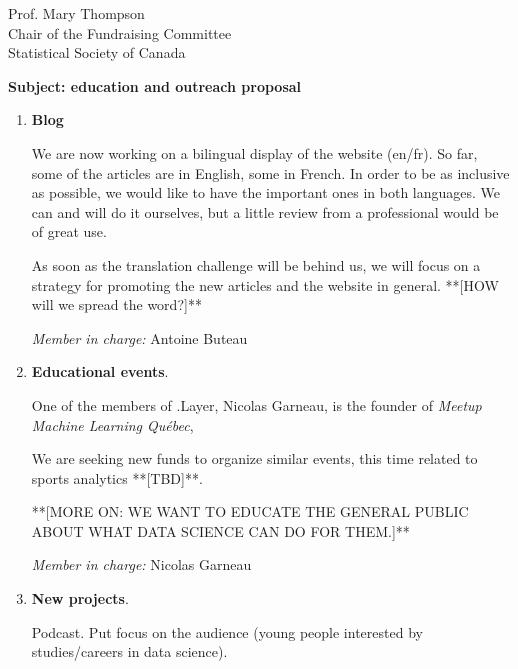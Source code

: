 \documentclass[11pt, a4paper]{letter} %
\begin{document}
\begin{letter}{
	Prof. Mary Thompson\\
	Chair of the Fundraising Committee\\
	Statistical Society of Canada
	
	\bigskip
	\textbf{Subject: education and outreach proposal}%
}
\begin{enumerate}
	\quad We are lucky to have among us a professional graphic designer, Jean-Christophe Yelle, who created, at no cost, the logo that you can see in the head of the letter. Among the other things we wish to integrate to the community are personalized e-mail addresses (@dotlayer.org) for the administering members and +++++++ **[WHAT MORE? - @steph @bute - membership fees here?]**
	
	\bigskip
	\emph{Member in charge:} Stéphane Caron\\
	
	\item \textbf{Blog}
	
	\quad We are now working on a bilingual display of the website (en/fr). So far, some of the articles are in English, some in French. In order to be as inclusive as possible, we would like to have the important ones in both languages. We can and will do it ourselves, but a little review from a professional would be of great use.
	
	\quad As soon as the translation challenge will be behind us, we will focus on a strategy for promoting the new articles and the website in general. **[HOW will we spread the word?]**
	
	
	\bigskip
	\emph{Member in charge:} Antoine Buteau\\
	
	\item \textbf{Educational events}.
	
	\quad One of the members of .Layer, Nicolas Garneau, is the founder of \emph{Meetup	Machine Learning Québec}, 
	
\quad We are seeking new funds to organize similar events, this time related to sports analytics **[TBD]**.
	
**[MORE ON: WE WANT TO EDUCATE THE GENERAL PUBLIC ABOUT WHAT DATA SCIENCE CAN DO FOR THEM.]**
			
	\bigskip
	\emph{Member in charge:} Nicolas Garneau\\
	
	\item \textbf{New projects}.
	
	\quad Podcast. Put focus on the audience (young people interested by studies/careers in data science).
	

\end{enumerate}
\end{letter}
\end{document}
